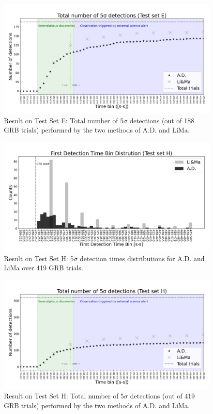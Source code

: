 \begin{figure}[t]
\centering
\includegraphics[width=1\textwidth]{figures/experiments/ad_vs_li_cumulative_testset_e_id_1.png}
\caption{Result on Test Set E: Total number of 5$\sigma$ detections (out of 188 GRB trials) performed by the two methods of A.D. and LiMa.}
\label{f:ad-vs-lima}
\end{figure}

\begin{figure}[t]
\centering
\includegraphics[width=1\textwidth]{figures/experiments/ad_vs_li_ma_first_detections_testset_h_id_1.png}
\caption{Result on Test Set H: 5$\sigma$ detection times distributions for A.D. and LiMa over 419 GRB trials.}
\label{f:ad-vs-lima-first-detection}
\end{figure}


\begin{figure}[t]
\centering
\includegraphics[width=1\textwidth]{figures/experiments/ad_vs_li_cumulative_testset_h_id_1.png}
\caption{Result on Test Set H: Total number of 5$\sigma$ detections (out of 419 GRB trials) performed by the two methods of A.D. and LiMa.}
\label{f:ad-vs-lima}
\end{figure}





